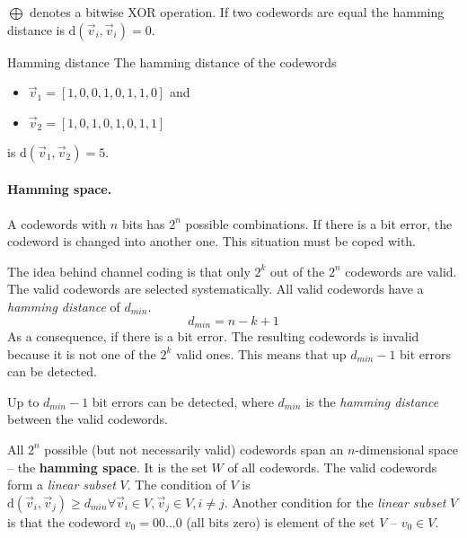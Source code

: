 \begin{refsection}
$\bigoplus$ denotes a bitwise \ac{XOR} operation. If two codewords are equal the hamming distance is $\mathrm{d}\left(\vec{v}_i, \vec{v}_i\right) = 0$.

\begin{example}{Hamming distance}
	The hamming distance of the codewords
	\begin{itemize}
		\item $\vec{v}_1 = \left[1, 0, 0, 1, 0, 1, 1, 0\right]$ and
		\item $\vec{v}_2 = \left[1, 0, 1, 0, 1, 0, 1, 1\right]$
	\end{itemize}
	is $\mathrm{d}\left(\vec{v}_1, \vec{v}_2\right) = 5$.
\end{example}

\paragraph{Hamming space.}

A codewords with $n$ bits has $2^n$ possible combinations. If there is a bit error, the codeword is changed into another one. This situation must be coped with.

The idea behind channel coding is that only $2^k$ out of the $2^n$ codewords are valid. The valid codewords are selected systematically. All valid codewords have a \emph{hamming distance} of $d_{min}$.
\begin{equation}
	d_{min} = n - k + 1
	\label{eq:ch08:hamming_dist_code}
\end{equation}
As a consequence, if there is a bit error. The resulting codewords is invalid because it is not one of the $2^k$ valid ones. This means that up $d_{min} - 1$ bit errors can be detected.

\begin{fact}
	Up to $d_{min} - 1$ bit errors can be detected, where $d_{min}$ is the \emph{hamming distance} between the valid codewords.
\end{fact}

All $2^n$ possible (but not necessarily valid) codewords span an $n$-dimensional space -- the  \textbf{hamming space}. It is the set $W$ of all codewords. The valid codewords form a \emph{linear subset} $V$. The condition of $V$ is $\mathrm{d}\left(\vec{v}_i, \vec{v}_j\right) \geq d_{min} \forall \vec{v}_i \in V, \vec{v}_j \in V, i \neq j$. Another condition for the \emph{linear subset} $V$ is that the codeword $v_0 = 00\ldots0$ (all bits zero) is element of the set $V$ -- $v_0 \in V$.


\end{refsection}
